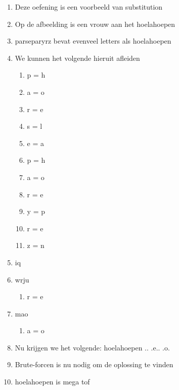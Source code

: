 \begin{enumerate}
  \item Deze oefening is een voorbeeld van substitution
  \item Op de afbeelding is een vrouw aan het hoelahoepen
  \item parseparyrz bevat evenveel letters als hoelahoepen
  \item We kunnen het volgende hieruit afleiden
  \begin{enumerate}
  \item p = h
  \item a = o
  \item r = e
  \item s = l
  \item e = a
  \item p = h
  \item a = o
  \item r = e
  \item y = p
  \item r = e
  \item z = n
  \end{enumerate}
  \item iq
  \item wrju
  \begin{enumerate}
  \item r = e
  \end{enumerate}
  \item mao
  \begin{enumerate}
  \item a = o
  \end{enumerate}
  \item Nu krijgen we het volgende: hoelahoepen .. .e.. .o.
  \item Brute-forcen is nu nodig om de oplossing te vinden
  \item hoelahoepen is mega tof
\end{enumerate}